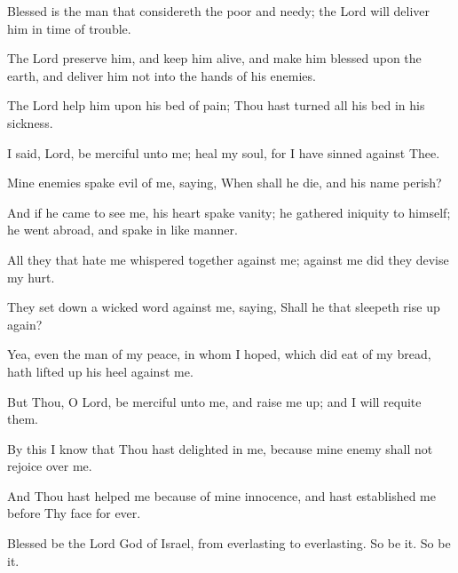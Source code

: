 Blessed is the man that considereth the poor and needy; the
Lord will deliver him in time of trouble.

The Lord preserve him, and keep him alive, and make him
blessed upon the earth, and deliver him not into the hands of his
enemies.

The Lord help him upon his bed of pain; Thou hast turned all
his bed in his sickness.

I said, Lord, be merciful unto me; heal my soul, for I have
sinned against Thee.

Mine enemies spake evil of me, saying, When shall he die, and
his name perish?

And if he came to see me, his heart spake vanity; he gathered
iniquity to himself; he went abroad, and spake in like manner.

All they that hate me whispered together against me; against
me did they devise my hurt.

They set down a wicked word against me, saying, Shall he that
sleepeth rise up again?

Yea, even the man of my peace, in whom I hoped, which did
eat of my bread, hath lifted up his heel against me.

But Thou, O Lord, be merciful unto me, and raise me up; and
I will requite them.

By this I know that Thou hast delighted in me, because mine
enemy shall not rejoice over me.

And Thou hast helped me because of mine innocence, and
hast established me before Thy face for ever.

Blessed be the Lord God of Israel, from everlasting to
everlasting. So be it. So be it.
